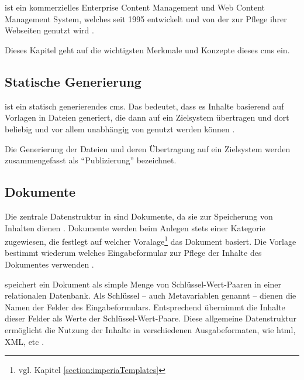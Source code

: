 \section{\imperia}
    \label{section:Imperia}
    {\imperia} ist ein kommerzielles Enterprise Content Management und
    Web Content Management System, welches seit 1995 entwickelt
    \cite{imperia:about, imperia:historie} und von 
    der {\fernUni} zur Pflege ihrer Webseiten genutzt wird
    \cite{fernUni:imperia}.

    Dieses Kapitel geht auf die wichtigsten Merkmale und Konzepte
    dieses \gls{cms} ein.

    \subsection{Statische Generierung}
        \label{section:imperiaStaticGeneration}
        {\imperia} ist ein statisch generierendes \gls{cms}.
        Das bedeutet, dass es Inhalte basierend auf Vorlagen
        in Dateien generiert, die dann auf ein Zielsystem übertragen
        und dort beliebig und vor allem unabhängig von
        {\imperia} genutzt werden können
        \cite[Kapitel 1.1]{imperia:ecmd}.

        Die Generierung der Dateien und deren Übertragung auf ein Zielsystem
        werden zusammengefasst als "`Publizierung"' bezeichnet.


    \subsection{Dokumente}
        \label{section:imperiaDocuments}
        Die zentrale Datenstruktur in {\imperia} sind Dokumente,
        da sie zur Speicherung von Inhalten dienen
        \cite[Kapitel 1.1]{imperia:ecmd}.
        Dokumente werden beim Anlegen stets einer Kategorie zugewiesen,
        die festlegt auf welcher Voralage\footnote{vgl. Kapitel \ref{section:imperiaTemplates}}
        das Dokument basiert.
        Die Vorlage bestimmt wiederum welches Eingabeformular
        {\editors} zur Pflege der Inhalte des Dokumentes verwenden
        \cite[Kapitel 1.1.4]{imperia:ecmd}.
        
        {\imperia} speichert ein Dokument als simple Menge von
        Schlüssel-Wert-Paaren in einer relationalen Datenbank.
        Als Schlüssel -- auch Metavariablen genannt -- dienen die Namen der Felder des Eingabeformulars.
        Entsprechend übernimmt {\imperia} die Inhalte dieser Felder
        als Werte der Schlüssel-Wert-Paare.
        Diese allgemeine Datenstruktur ermöglicht die Nutzung der Inhalte
        in verschiedenen Ausgabeformaten, wie \gls{html}, XML, etc
        \cite[Kapitel 1.1.2]{imperia:ecmd}.

